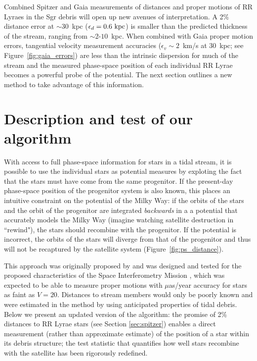 \documentclass[preprint]{aastex}
\begin{document}
Combined Spitzer and Gaia measurements of distances and proper motions
of RR Lyraes in the Sgr debris will open up new avenues of
interpretation. A 2\% distance error at $\sim$30~kpc
($\epsilon_{d}=0.6~{\rm kpc}$) is smaller than the predicted thickness
of the stream, ranging from $\sim$2-$10$~kpc. When combined with Gaia proper motion errors,
tangential velocity measurement accuracies ($\epsilon_{v}\sim2$~km/s
at 30~kpc; see Figure~\ref{fig:gaia_errors}) are less than the intrinsic dispersion for much of the stream
\citep[$\sigma_v\sim10$~km/s;][]{majewski04} and the measured phase-space position of each individual RR
Lyrae becomes a powerful probe of the potential. The next section
outlines a new method to take advantage of this information.

\section{Description and test of our algorithm}
\label{sec:method}
With access to full phase-space information for stars in a tidal
stream, it is possible to use the individual stars as potential
measures by exploting the fact that the stars must have come from the
same progenitor. If the present-day phase-space position of the
progenitor system is also known, this places an intuitive constraint
on the potential of the Milky Way: if the orbits of the stars and the
orbit of the progenitor are integrated \emph{backwards} in a a potential that accurately models the Milky Way
(imagine watching satellite destruction in ``rewind"), the stars
should recombine with the progenitor. If the potential is incorrect,
the orbits of the stars will diverge from that of the progenitor and
thus will not be recaptured by the satellite system
(Figure~\ref{fig:ps_distance}).

This approach was originally proposed by \citet{johnston99a} and was
designed and tested for the proposed characteristics of the Space
Interferometry Mission \citep{unwin08}, which was expected to be able
to measure proper motions with $\mu$as/year accuracy for stars as
faint as $V=20$. Distances to stream members would only be poorly
known and were estimated in the method by using anticipated properties
of tidal debris. Below we present an updated version of the algorithm:
the promise of 2\% distances to RR Lyrae stars (see Section
\ref{sec:spitzer}) enables a direct measurement (rather than
approximate estimate) of the position of a star within its debris
structure; the test statistic that quantifies how well stars recombine
with the satellite has been rigorously redefined.
\end{document}

